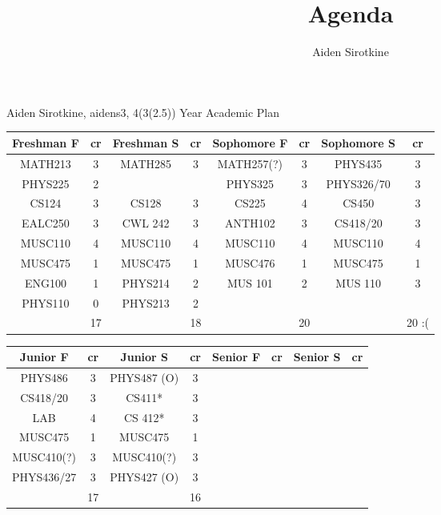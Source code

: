 \documentclass{article}
\date{}
\title{Agenda}
\author{Aiden Sirotkine}
\begin{document}
Aiden Sirotkine, aidens3, 4(3(2.5)) Year Academic Plan
\begin{center}
\begin{tabular}{| c | c | c | c | c | c | c | c |}
Freshman F& cr & Freshman S & cr & Sophomore F & cr & Sophomore S & cr  \\ \hline
MATH213 & 3 & MATH285 & 3 & MATH257(?) & 3 & PHYS435& 3\\ \hline
PHYS225 & 2 & & & PHYS325 & 3 & PHYS326/70 & 3\\ \hline
CS124 & 3 & CS128 & 3 & CS225 & 4 & CS450 & 3\\ \hline
EALC250 & 3 & CWL 242 & 3 & ANTH102 & 3 & CS418/20 & 3 \\ \hline
MUSC110 & 4 & MUSC110 & 4 & MUSC110 & 4 & MUSC110 & 4\\ \hline
MUSC475 & 1 & MUSC475 & 1 & MUSC476 & 1 & MUSC475 & 1 \\ \hline
ENG100 & 1 & PHYS214 & 2 & MUS 101 & 2 & MUS 110 & 3 \\ \hline
PHYS110 & 0 & PHYS213 & 2\\ \hline
 & 17 & & 18 & & 20 & & 20 :(\\ \hline


\end{tabular}
\end{center}

\begin{center}
\begin{tabular}{| c | c | c | c | c | c | c | c |}
Junior F& cr & Junior S & cr & Senior F & cr & Senior S & cr  \\ \hline
PHYS486 & 3 &  PHYS487 (O) & 3\\ \hline
CS418/20 & 3 & CS411* & 3 \\ \hline
LAB & 4 & CS 412* & 3 	\\ \hline
MUSC475 & 1 & MUSC475 & 1 \\ \hline
MUSC410(?) & 3 & MUSC410(?) & 3 \\ \hline
PHYS436/27 & 3 & PHYS427 (O) & 3 \\ \hline
& 17 & & 16 \\ \hline


\end{tabular}
\end{center}


\end{document}
